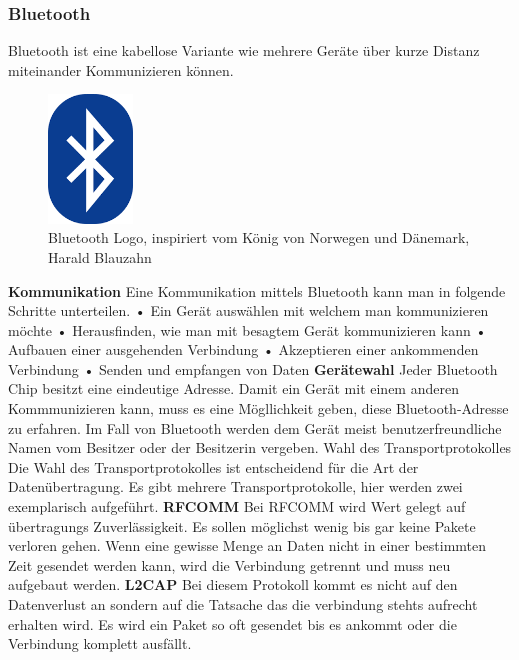 \subsubsection{Bluetooth}
\label{subsec:Bluetooth}
Bluetooth ist eine kabellose Variante wie mehrere Geräte über kurze Distanz miteinander Kommunizieren können.

\begin{figure}
  \begin{center}
    \includegraphics[width=0.2\textwidth]{images/bluetooth}
  \end{center}
  \caption{Bluetooth Logo, inspiriert vom König von Norwegen und Dänemark, Harald Blauzahn \cite{PERT.CH2-bluetooth.logo}}\label{Fig:imgBluetoothLogo}
\end{figure}

\textbf{Kommunikation\newline}
Eine Kommunikation mittels Bluetooth kann man in folgende Schritte unterteilen.
\nextline
•	Ein Gerät auswählen mit welchem man kommunizieren möchte
\nextline
•	Herausfinden, wie man mit besagtem Gerät kommunizieren kann
\nextline
•	Aufbauen einer ausgehenden Verbindung
\nextline
•	Akzeptieren einer ankommenden Verbindung
\nextline
•	Senden und empfangen von Daten
\nextline
\textbf{Gerätewahl\nextline}
Jeder Bluetooth Chip besitzt eine eindeutige Adresse. Damit ein Gerät mit einem anderen Kommmunizieren kann, muss es eine Mögllichkeit geben, diese Bluetooth-Adresse zu erfahren. Im Fall von Bluetooth werden dem Gerät meist benutzerfreundliche Namen vom Besitzer oder der Besitzerin vergeben.
Wahl des Transportprotokolles
Die Wahl des Transportprotokolles ist entscheidend für die Art der Datenübertragung. Es gibt mehrere Transportprotokolle, hier werden zwei exemplarisch aufgeführt.
\nextline
\textbf{RFCOMM\nextline}
Bei RFCOMM wird Wert gelegt auf übertragungs Zuverlässigkeit. Es sollen möglichst wenig bis gar keine Pakete verloren gehen. Wenn eine gewisse Menge an Daten nicht in einer bestimmten Zeit gesendet werden kann, wird die Verbindung getrennt und muss neu aufgebaut werden.
\nextline
\textbf{L2CAP\nextline}
Bei diesem Protokoll kommt es nicht auf den Datenverlust an sondern auf die Tatsache das die verbindung stehts aufrecht erhalten wird. Es wird ein Paket so oft gesendet bis es ankommt oder die Verbindung komplett ausfällt.